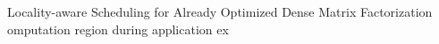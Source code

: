 \begin{frame}[label=ladmf]{Locality-aware Scheduling for Already Optimized Dense Matrix Factorization}
omputation region during application ex
\end{frame}
